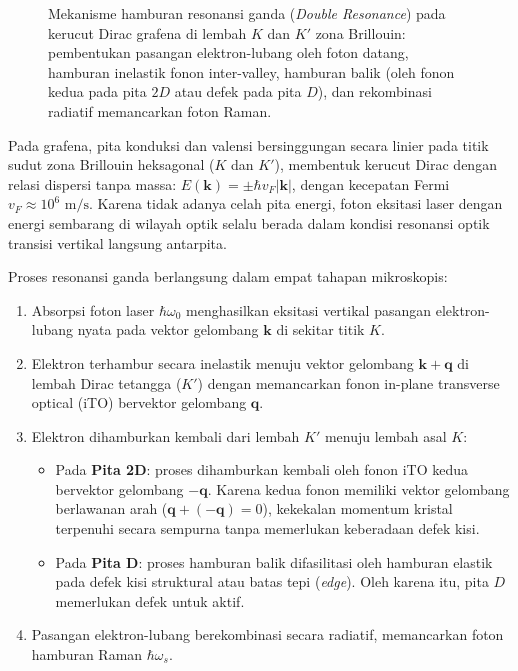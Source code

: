 \begin{figure}[htbp]
\centering
\resizebox{0.82\textwidth}{!}{}
\caption{Mekanisme hamburan resonansi ganda (\textit{Double Resonance}) pada kerucut Dirac grafena di lembah $K$ dan $K'$ zona Brillouin: pembentukan pasangan elektron-lubang oleh foton datang, hamburan inelastik fonon inter-valley, hamburan balik (oleh fonon kedua pada pita $2D$ atau defek pada pita $D$), dan rekombinasi radiatif memancarkan foton Raman.}
\label{fig:double_resonance}
\end{figure}

Pada grafena, pita konduksi dan valensi bersinggungan secara linier pada titik sudut zona Brillouin heksagonal ($K$ dan $K'$), membentuk kerucut Dirac dengan relasi dispersi tanpa massa: $E(\mathbf{k}) = \pm \hbar v_F |\mathbf{k}|$, dengan kecepatan Fermi $v_F \approx 10^6\text{ m/s}$. Karena tidak adanya celah pita energi, foton eksitasi laser dengan energi sembarang di wilayah optik selalu berada dalam kondisi resonansi optik transisi vertikal langsung antarpita.

Proses resonansi ganda berlangsung dalam empat tahapan mikroskopis:
\begin{enumerate}
    \item Absorpsi foton laser $\hbar\omega_0$ menghasilkan eksitasi vertikal pasangan elektron-lubang nyata pada vektor gelombang $\mathbf{k}$ di sekitar titik $K$.
    \item Elektron terhambur secara inelastik menuju vektor gelombang $\mathbf{k} + \mathbf{q}$ di lembah Dirac tetangga ($K'$) dengan memancarkan fonon in-plane transverse optical (iTO) bervektor gelombang $\mathbf{q}$.
    \item Elektron dihamburkan kembali dari lembah $K'$ menuju lembah asal $K$:
    \begin{itemize}
        \item Pada \textbf{Pita 2D}: proses dihamburkan kembali oleh fonon iTO kedua bervektor gelombang $-\mathbf{q}$. Karena kedua fonon memiliki vektor gelombang berlawanan arah ($\mathbf{q} + (-\mathbf{q}) = 0$), kekekalan momentum kristal terpenuhi secara sempurna tanpa memerlukan keberadaan defek kisi.
        \item Pada \textbf{Pita D}: proses hamburan balik difasilitasi oleh hamburan elastik pada defek kisi struktural atau batas tepi (\textit{edge}). Oleh karena itu, pita $D$ memerlukan defek untuk aktif.
    \end{itemize}
    \item Pasangan elektron-lubang berekombinasi secara radiatif, memancarkan foton hamburan Raman $\hbar\omega_s$.
\end{enumerate}

